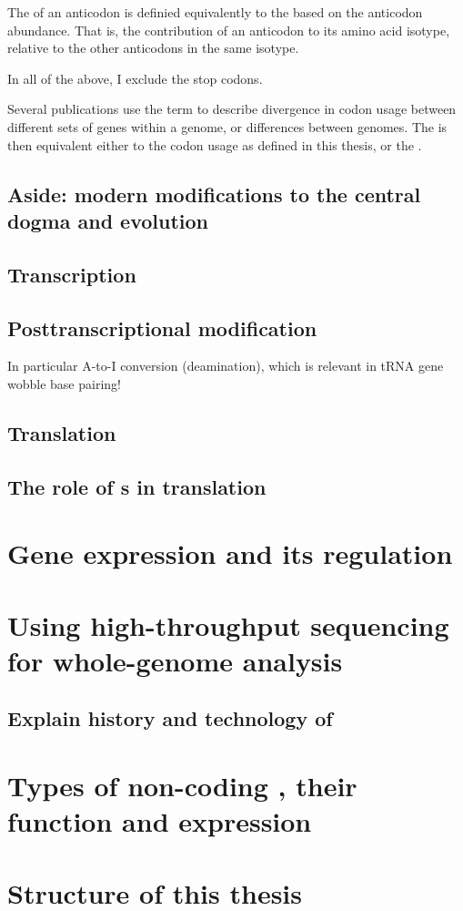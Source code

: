 The  of an anticodon is definied equivalently to the \rcu based on
the anticodon abundance. That is, the contribution of an anticodon to its amino
acid isotype, relative to the other anticodons in the same isotype.

In all of the above, I exclude the stop codons.

Several publications use the term \cub to describe divergence in codon usage
between different sets of genes within a genome, or differences between genomes.
The \cub is then equivalent either to the codon usage as defined in this thesis,
or the \rcu.

\subsection{Aside: modern modifications to the central dogma and evolution}

\subsection{Transcription}

\subsection{Posttranscriptional modification}

In particular A-to-I conversion (deamination), which is relevant in tRNA gene
wobble base pairing!

\subsection{Translation}

\subsection{The role of s in translation}

\section{Gene expression and its regulation}

\section{Using high-throughput sequencing for whole-genome analysis}

\subsection{Explain history and technology of }

\section{Types of non-coding , their function and expression}

\section{Structure of this thesis}
